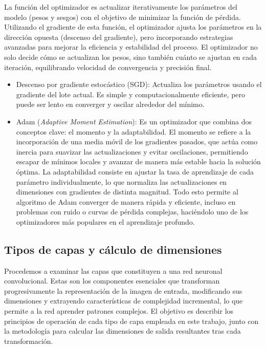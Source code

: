 
La función del optimizador es actualizar iterativamente los parámetros del modelo (pesos y sesgos) con el objetivo de minimizar la función de pérdida. Utilizando el gradiente de esta función, el optimizador ajusta los parámetros en la dirección opuesta (descenso del gradiente), pero incorporando estrategias avanzadas para mejorar la eficiencia y estabilidad del proceso. El optimizador no solo decide cómo se actualizan los pesos, sino también cuánto se ajustan en cada iteración, equilibrando velocidad de convergencia y precisión final.

\begin{itemize}
    \item Descenso por gradiente estocástico (SGD): Actualiza los parámetros usando el gradiente del lote actual. Es simple y computacionalmente eficiente, pero puede ser lento en converger y oscilar alrededor del mínimo.
    \item Adam (\emph{Adaptive Moment Estimation}): Es un optimizador que combina dos conceptos clave: el momento y la adaptabilidad. El momento se refiere a la incorporación de una media móvil de los gradientes pasados, que actúa como inercia para suavizar las actualizaciones y evitar oscilaciones, permitiendo escapar de mínimos locales y avanzar de manera más estable hacia la solución óptima. La adaptabilidad consiste en ajustar la tasa de aprendizaje de cada parámetro individualmente, lo que normaliza las actualizaciones en dimensiones con gradientes de distinta magnitud. Todo esto permite al algoritmo de Adam converger de manera rápida y eficiente, incluso en problemas con ruido o curvas de pérdida complejas, haciéndolo uno de los optimizadores más populares en el aprendizaje profundo.
\end{itemize}

\subsection{Tipos de capas y cálculo de dimensiones}\label{sec:tipos_capas}

Procedemos a examinar las capas que constituyen a una red neuronal convolucional. Estas son los componentes esenciales que transforman progresivamente la representación de la imagen de entrada, modificando sus dimensiones y extrayendo características de complejidad incremental, lo que permite a la red aprender patrones complejos. El objetivo es describir los principios de operación de cada tipo de capa empleada en este trabajo, junto con la metodología para calcular las dimensiones de salida resultantes tras cada transformación.

